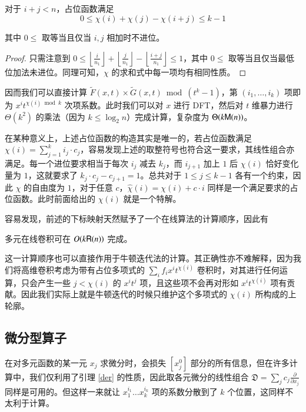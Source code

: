 \begin{lemma}
对于 $i+j<n$，占位函数满足
$$
0\le \chi(i) + \chi(j) - \chi(i+j) \le k-1
$$

其中 $0\le $ 取等当且仅当 $i,j$ 相加时不进位。
\end{lemma}

\begin{proof}
只需注意到 $0\le \left\lfloor \frac{i}{n_1}\right\rfloor + \left\lfloor \frac{j}{n_1}\right\rfloor - \left\lfloor \frac{i+j}{n_1}\right\rfloor\le 1$，其中 $0\le $ 取等当且仅当最低位加法未进位。同理可知，$\chi$ 的求和式中每一项均有相同性质。
\end{proof}

因而我们可以直接计算 $\tilde F(x,t) \times \tilde G(x, t) \bmod (t^k-1)$，第 $(i_1,\dots,i_k)$ 项即为 $x^it^{\chi(i)\bmod k}$ 次项系数。此时我们可以对 $x$ 进行 DFT，然后对 $t$ 维暴力进行 $\Theta(k^2)$ 的乘法（因为 $k\le \log_2 n$）完成计算，复杂度为 $\Theta(k\mathsf M(n))$。

在某种意义上，上述占位函数的构造其实是唯一的，若占位函数满足 $\chi(i) = \sum_{j=1}^k i_j \cdot c_j$，容易发现上述的取整符号也符合这一要求，其线性组合亦满足。每一个进位要求相当于每次 $i_j$ 减去 $k_j$，而 $i_{j+1}$ 加上 $1$ 后 $\chi(i)$ 恰好变化量为 $1$，这就要求了 $k_j\cdot c_j - c_{j+1} = 1$。总共对于 $1\le j\le k-1$ 各有一个约束，因此 $\chi$ 的自由度为 $1$，对于任意 $c$，$\widehat \chi(i) = \chi(i) + c \cdot i$ 同样是一个满足要求的占位函数。此时前面给出的 $\chi(i)$ 就是一个特解。

容易发现，前述的下标映射天然赋予了一个在线算法的计算顺序，因此有

\begin{lemma}
多元在线卷积可在 $O(k\mathsf R(n))$ 完成。
\end{lemma}

这一计算顺序也可以直接作用于牛顿迭代法的计算。其正确性亦不难解释，因为我们将高维卷积考虑为带有占位多项式的 $\sum_i f_i x^i t^{\chi(i)}$ 卷积时，对其进行任何运算，只会产生一些 $j < \chi(i)$ 的 $x^it^j$ 项，且这些项不会再对形如 $x^it^{\chi(i)}$ 项有贡献。因此我们实际上就是牛顿迭代的时候只维护这个多项式的 $\chi(i)$ 所构成的上轮廓。

\subsection{微分型算子}

在对多元函数的某一元 $x_j$ 求微分时，会损失 $[x_j^0]$ 部分的所有信息，但在许多计算中，我们仅利用了引理 \ref{der} 的性质，因此取各元微分的线性组合 $\mathfrak D=\sum_j c_j \frac{\partial}{\partial x_j}$ 同样是可用的。但这样一来就让 $x_1^{i_1}\dots x_k^{i_k}$ 项的系数分散到了 $k$ 个位置，这同样不太利于计算。

